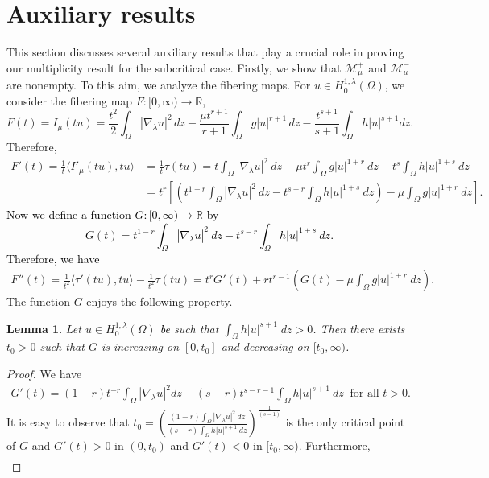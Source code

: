 \documentclass[12pt, notitlepage]{article}
\def\R{\mathbb{R}}
\newtheorem{lem}[theorem]{Lemma}
\begin{document}
{\section{Auxiliary results}\label{AUX}
This section discusses several auxiliary results that play a crucial role in proving our multiplicity result for the subcritical case. Firstly, we show that $\mathscr{M}^+_\mu$ and $\mathscr{M}^-_\mu$ are nonempty. To this aim, we analyze the fibering maps. For $u\in H^{1,\lambda}_0(\Omega)$, we consider the fibering map $F:[0,\infty)\to\R$,
$$F(t)=I_\mu(tu)=\frac{t^2}{2}\int_\Omega |\nabla_\lambda u|^2\, dz-\frac{\mu t^{r+1}}{r+1}\int_\Omega g|u|^{r+1}\, dz-\frac{t^{s+1}}{s+1}\int_\Omega h|u|^{s+1} dz.$$ Therefore,
\begin{align}\label{NM0}
   F'(t)=\frac{1}{t}\langle I'_\mu(tu),tu\rangle&=\frac{1}{t}\tau(tu)=t\int_\Omega |\nabla_\lambda u|^2\ dz-\mu t^{r}\int_\Omega g|u|^{1+r}\ dz-t^{s}\int_\Omega h|u|^{1+s}\ dz\nonumber\\
    &=t^{r}\left [\left ( t^{1-r}\int_\Omega |\nabla_\lambda u|^2\ dz-t^{s-r}\int_\Omega h|u|^{1+s}\ dz\right )-\mu\int_\Omega g|u|^{1+r} \ dz\right ].
\end{align}
\textcolor{black}{Now we define a function $G:[0,\infty)\to\R$ by
$$G(t)=t^{1-r}\int_\Omega |\nabla_\lambda u|^2\ dz-t^{s-r}\int_\Omega h|u|^{1+s}\ dz.$$
Therefore, we have}
\begin{align}\label{NM1}
    F''(t)=\frac{1}{t^2}\langle \tau'(tu),tu\rangle-\frac{1}{t^2}\tau(tu)=t^rG'(t)+rt^{r-1}\left (G(t)-\mu\int_\Omega g|u|^{1+r} \ dz\right ).
\end{align}
The function $G$ enjoys the following property.
\begin{lem}\label{LM1}
    Let $u\in H^{1,\lambda}_0(\Omega)$ \textcolor{black}{be} such that $\int_\Omega h|u|^{s+1}\;dz>0$. Then there exists $t_0>0$ such that $G$ is increasing on $[0,t_0]$ and decreasing on $[t_0,\infty)$\textcolor{black}{.}
\end{lem}
\begin{proof}
We have
\begin{align*}
       G'(t)=(1-r)t^{-r}\int_\Omega |\nabla_\lambda u|^2 dz-(s-r)t^{s-r-1}\int_\Omega h|u|^{s+1}\ dz\ \text{ for all } t>0.
   \end{align*}
It is easy to observe that $t_0=\left (\frac{(1-r)\int_\Omega |\nabla_\lambda u|^2\ dz}{(s-r)\int_\Omega h|u|^{s+1}\ dz}\right )^\frac{1}{(s-1)}$ is the only critical point of $G$ and $G'(t)>0$ in $(0,t_0)$ and $G'(t)<0$ in $[t_0,\infty)$. Furthermore, 
\begin{align}\label{SV}

\end{align}
\end{proof}}
\end{document}
